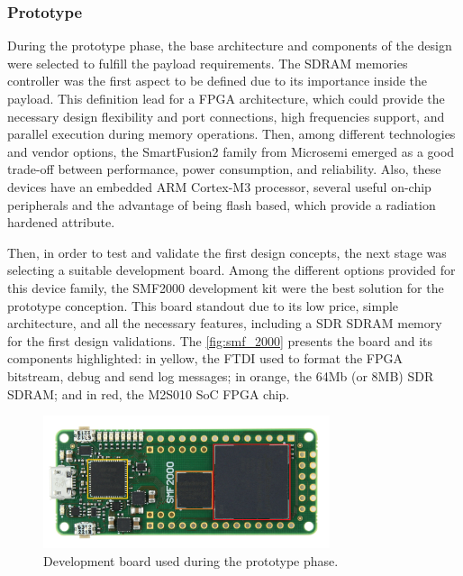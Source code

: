 
\subsubsection{Prototype}

During the prototype phase, the base architecture and components of the design were selected to fulfill the payload requirements. The SDRAM memories controller was the first aspect to be defined due to its importance inside the payload. This definition lead for a FPGA architecture, which could provide the necessary design flexibility and port connections, high frequencies support, and parallel execution during memory operations. Then, among different technologies and vendor options, the SmartFusion2 family from Microsemi emerged as a good trade-off between performance, power consumption, and reliability. Also, these devices have an embedded ARM Cortex-M3 processor, several useful on-chip peripherals and the advantage of being flash based, which provide a radiation hardened attribute.

Then, in order to test and validate the first design concepts, the next stage was selecting a suitable development board. Among the different options provided for this device family, the SMF2000 development kit were the best solution for the prototype conception. This board standout due to its low price, simple architecture, and all the necessary features, including a SDR SDRAM memory for the first design validations. The \autoref{fig:smf_2000} presents the board and its components highlighted: in yellow, the FTDI used to format the FPGA bitstream, debug and send log messages; in orange, the 64Mb (or 8MB) SDR SDRAM; and in red, the M2S010 SoC FPGA chip.

\begin{figure}[!ht]
    \begin{center}
        \includegraphics[width=0.75\textwidth]{figures/smf2000_top.jpg}
        \caption{Development board used during the prototype phase.}
        \label{fig:smf_2000}
    \end{center}
\end{figure}


